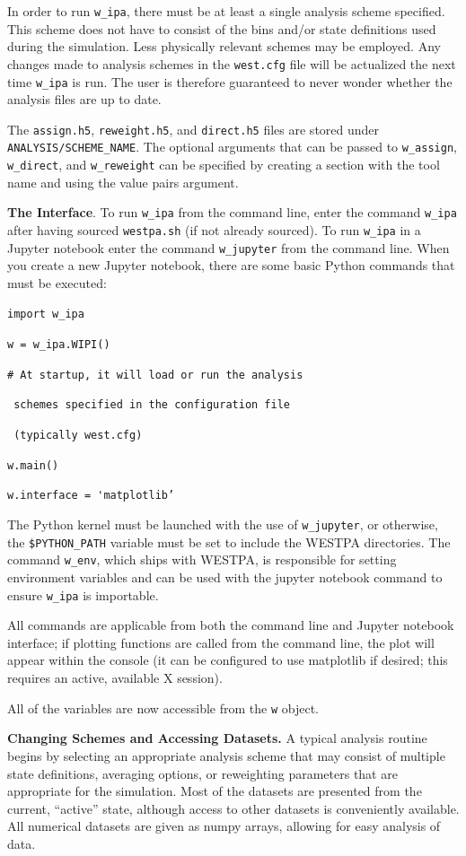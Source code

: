 \documentclass[9pt,tutorial,ASAPversion]{livecoms}
\begin{document}
In order to run \verb|w_ipa|, there must be at least a single analysis scheme specified. 
This scheme does not have to consist of the bins and/or state definitions used during the simulation. 
Less physically relevant schemes may be employed. 
Any changes made to analysis schemes in the \verb|west.cfg| file will be actualized the next time \verb|w_ipa| is run. 
The user is therefore guaranteed to never wonder whether the analysis files are up to date. 

The \verb|assign.h5|, \verb|reweight.h5|, and \verb|direct.h5| files are stored under \verb|ANALYSIS/SCHEME_NAME|.
The optional arguments that can be passed to \verb|w_assign|, \verb|w_direct|, and \verb|w_reweight| can be specified by creating a section with the tool name and using the value pairs argument. 

\textbf{The Interface}. To run \verb|w_ipa| from the command line, enter the command \verb|w_ipa| after having sourced \verb|westpa.sh| (if not already sourced). 
To run \verb|w_ipa| in a Jupyter notebook enter the command \verb|w_jupyter| from the command line. 
When you create a new Jupyter notebook, there are some basic Python commands that must be executed:

\verb|import w_ipa|

\verb|w = w_ipa.WIPI()|

\verb|# At startup, it will load or run the analysis|

\verb| schemes specified in the configuration file|

\verb| (typically west.cfg)|

\verb|w.main()|

\verb|w.interface = 'matplotlib’|

The Python kernel must be launched with the use of \verb|w_jupyter|, or otherwise, the \verb|$PYTHON_PATH| variable must be set to include the WESTPA directories. 
The command \verb|w_env|, which ships with WESTPA, is responsible for setting environment variables and can be used with the jupyter notebook command to ensure \verb|w_ipa| is importable.

All commands are applicable from both the command line and Jupyter notebook interface; if plotting functions are called from the command line, the plot will appear within the console (it can be configured to use matplotlib if desired; this requires an active, available X session).

All of the variables are now accessible from the \verb|w| object.

\textbf{Changing Schemes and Accessing Datasets.} A typical analysis routine begins by selecting an appropriate analysis scheme that may consist of multiple state definitions, averaging options, or reweighting parameters that are appropriate for the simulation. 
Most of the datasets are presented from the current, “active” state, although access to other datasets is conveniently available. 
All numerical datasets are given as numpy arrays, allowing for easy analysis of data.
\end{document}
